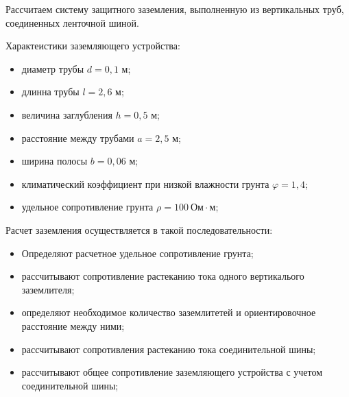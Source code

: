         Рассчитаем систему защитного заземления, выполненную из вертикальных
        труб, соединенных ленточной шиной.

        Характеистики заземляющего устройства:
        \begin{itemize}
            \item диаметр трубы $d = 0,1$ м;
            \item длинна трубы  $l = 2,6$ м;
            \item величина заглубления $h = 0,5$ м;
            \item расстояние между трубами $a = 2,5$ м;
            \item ширина полосы $b = 0,06$ м;
            \item климатический коэффициент при низкой влажности грунта 
                $\varphi = 1,4$;
            \item удельное сопротивление грунта 
                $\rho = 100 \ \text{Ом} \cdot \text{м}$;
        \end{itemize}

        Расчет заземления осуществляется в такой последовательности:
        \begin{itemize}
            \item Определяют расчетное удельное сопротивление грунта;
            \item рассчитывают сопротивление растеканию тока одного
                вертикалього заземлителя;
            \item определяют необходимое количество заземлитетей и
                ориентировочное расстояние между ними;
            \item рассчитывают сопротивления растеканию тока соединительной
                шины;
            \item рассчитывают общее сопротивление заземляющего устройства с
                учетом соединительной шины;
            \end{itemize}

